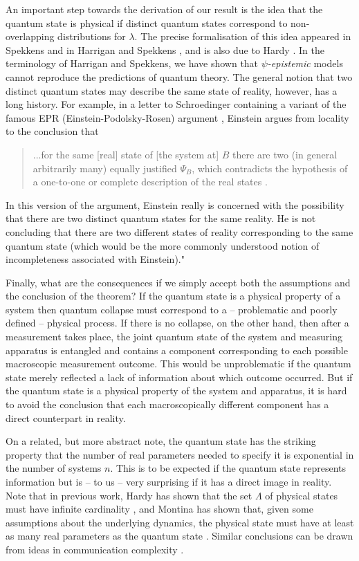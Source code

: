 \documentclass[amsmath,amssymb,superscriptaddress,pra,12pt]{revtex4-1}
\begin{document}
An important step towards the derivation of our result is the idea that the quantum state is physical if distinct quantum states correspond to non-overlapping distributions for $\lambda$. The precise formalisation of this idea appeared in Spekkens \cite{context} and in Harrigan and Spekkens \cite{nic}, and is also due to Hardy \cite{hpriv}. In the terminology of Harrigan and Spekkens, we have shown that \emph{$\psi$-epistemic} models cannot reproduce the predictions of quantum theory. The general notion that two distinct quantum states may describe the same state of reality, however, has a long history. For example, in a letter to Schroedinger containing a variant of the famous EPR (Einstein-Podolsky-Rosen) argument \cite{epr}, Einstein argues from locality to the conclusion that
\begin{quotation}
...for the same [real] state of [the system at] $B$ there are two (in general arbitrarily many) equally justified $\Psi_B$, which contradicts the hypothesis of a one-to-one or complete description of the real states \cite{einquote}.
\end{quotation}
In this version of the argument, Einstein really is concerned with the possibility that there are two distinct quantum states for the same reality. He is not concluding that there are two different states of reality corresponding to the same quantum state (which would be the more commonly understood notion of incompleteness associated with Einstein)."

Finally, what are the consequences if we simply accept both the assumptions and the conclusion of the theorem? If the quantum state is a physical property of a system then quantum collapse must correspond to a -- problematic and poorly defined -- physical process. If there is no collapse, on the other hand, then after a measurement takes place, the joint quantum state of the system and measuring apparatus is entangled and contains a component corresponding to each possible macroscopic measurement outcome. This would be unproblematic if the quantum state merely reflected a lack of information about which outcome occurred. But if the quantum state is a physical property of the system and apparatus, it is hard to avoid the conclusion that each macroscopically different component has a direct counterpart in reality.

On a related, but more abstract note, the quantum state has the striking property that the number of real parameters needed to specify it is exponential in the number of systems $n$. This is to be expected if the quantum state represents information but is -- to us -- very surprising if it has a direct image in reality. Note that in previous work, Hardy has shown that the set $\Lambda$ of physical states must have infinite cardinality \cite{baggage}, and Montina has shown that, given some assumptions about the underlying dynamics, the physical state must have at least as many real parameters as the quantum state \cite{montina2,montina}. Similar conclusions can be drawn from ideas in communication complexity \cite{complex}.  
\end{document}
